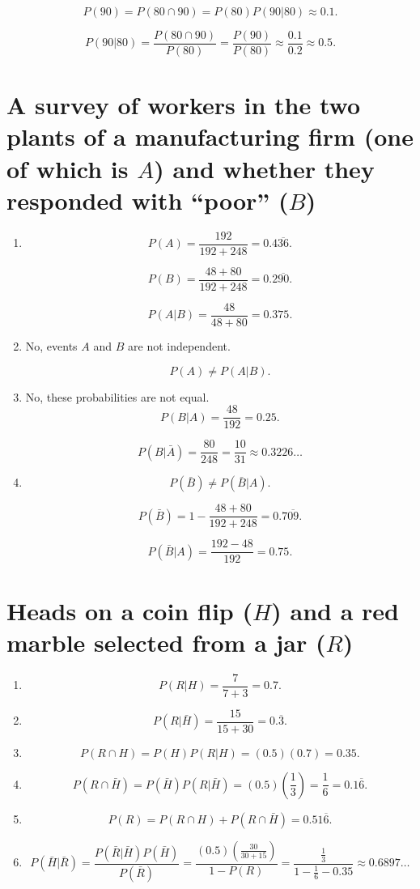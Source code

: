 \documentclass[12pt]{article}
\begin{document}
\[P(90)=P(80\cap 90)=P(80)P(90|80)\approx 0.1.\]

\[P(90|80)=\frac{P(80\cap 90)}{P(80)}=\frac{P(90)}{P(80)}\approx\frac{0.1}{0.2}\approx0.5.\]
\section{A survey of workers in the two plants of a manufacturing firm (one of which is $A$) and whether they responded with ``poor'' ($B$)}
\begin{enumerate}
\item 
\[P(A)=\frac{192}{192+248}=0.4\overline{36}.\]

\[P(B)=\frac{48+80}{192+248}=0.2\overline{90}.\]

\[P(A|B)=\frac{48}{48+80}=0.375.\]
\item No, events $A$ and $B$ are not independent.

\[P(A)\neq P(A|B).\]
\item No, these probabilities are not equal.
\[P(B|A)=\frac{48}{192}=0.25.\]

\[P(B|\bar{A})=\frac{80}{248}=\frac{10}{31}\approx 0.3226\dots\]
\item
\[P(\bar{B})\neq P(\bar{B}|A).\]

\[P(\bar{B})=1-\frac{48+80}{192+248}=0.7\overline{09}.\]

\[P(\bar{B}|A)=\frac{192-48}{192}=0.75.\]
\end{enumerate}
\section{Heads on a coin flip ($H$) and a red marble selected from a jar ($R$)}
\begin{enumerate}
    \item\[P(R|H)=\frac{7}{7+3}=0.7.\]
    \item\[P(R|\bar{H})=\frac{15}{15+30}=0.\overline{3}.\]
    \item\[P(R\cap H)=P(H)P(R|H)=(0.5)(0.7)=0.35.\]
    \item\[P(R\cap\bar{H})=P(\bar{H})P(R|\bar{H})=(0.5)\left(\frac{1}{3}\right)=\frac{1}{6}= 0.1\overline{6}.\]
    \item\[P(R)=P(R\cap H)+P(R\cap\bar{H})=0.51\overline{6}.\]
    \item\[P(\bar{H}|\bar{R})=\frac{P(\bar{R}|\bar{H})P(\bar{H})}{P(\bar{R})}=\frac{(0.5)(\frac{30}{30+15})}{1-P(R)}=\frac{\frac{1}{3}}{1-\frac{1}{6}-0.35}\approx 0.6897\dots\]
\end{enumerate}
\end{document}

